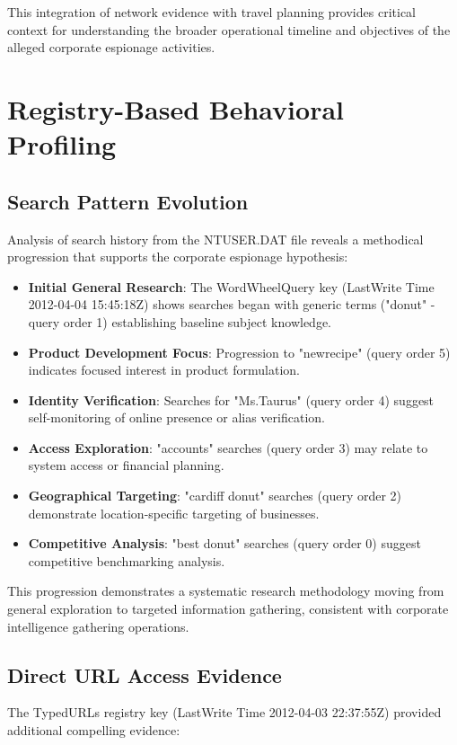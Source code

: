 This integration of network evidence with travel planning provides critical context for understanding the broader operational timeline and objectives of the alleged corporate espionage activities.

\section{Registry-Based Behavioral Profiling}
\subsection{Search Pattern Evolution}
Analysis of search history from the NTUSER.DAT file reveals a methodical progression that supports the corporate espionage hypothesis:

\begin{itemize}
    \item \textbf{Initial General Research}: The WordWheelQuery key (LastWrite Time 2012-04-04 15:45:18Z) shows searches began with generic terms ("donut" - query order 1) establishing baseline subject knowledge.
    
    \item \textbf{Product Development Focus}: Progression to "newrecipe" (query order 5) indicates focused interest in product formulation.
    
    \item \textbf{Identity Verification}: Searches for "Ms.Taurus" (query order 4) suggest self-monitoring of online presence or alias verification.
    
    \item \textbf{Access Exploration}: "accounts" searches (query order 3) may relate to system access or financial planning.
    
    \item \textbf{Geographical Targeting}: "cardiff donut" searches (query order 2) demonstrate location-specific targeting of businesses.
    
    \item \textbf{Competitive Analysis}: "best donut" searches (query order 0) suggest competitive benchmarking analysis.
\end{itemize}

This progression demonstrates a systematic research methodology moving from general exploration to targeted information gathering, consistent with corporate intelligence gathering operations.

\subsection{Direct URL Access Evidence}
The TypedURLs registry key (LastWrite Time 2012-04-03 22:37:55Z) provided additional compelling evidence:

